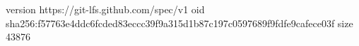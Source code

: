 version https://git-lfs.github.com/spec/v1
oid sha256:f57763e4ddc6fcded83eccc39f9a315d1b87c197c0597689f9fdfe9cafece03f
size 43876
